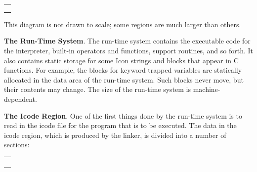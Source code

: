 \begin{center}
\tabletail{}
\tablelasttail{}
\begin{supertabular}{|m{2.30666in}|}
\hline
\centering{}\\\hline
\centering{}\\\hline
\centering{}\\\hline
\centering{}\\\hline
\end{supertabular}
\end{center}

This diagram is not drawn to scale; some regions are much larger than others.


\textbf{The Run-Time System}. The run-time system contains the
executable code for the interpreter, built-in operators and functions,
support routines, and so forth. It also contains static storage for
some Icon strings and blocks that appear in C functions. For example,
the blocks for keyword trapped variables are statically allocated in
the data area of the run-time system. Such blocks never move, but
their contents may change. The size of the run-time system is
machine-dependent.

\textbf{The Icode Region}. One of the first things done by the
run-time system is to read in the icode file for the program that is
to be executed. The data in the icode region, which is produced by the
linker, is divided into a number of sections:

\begin{center}
\tabletail{}
\tablelasttail{}
\begin{supertabular}{|m{2.2962599in}|}
\hline
\centering{}\\\hline
\centering{}\\\hline
\centering{}\\\hline
\centering{}\\\hline
\centering{}\\\hline
\end{supertabular}
\end{center}

